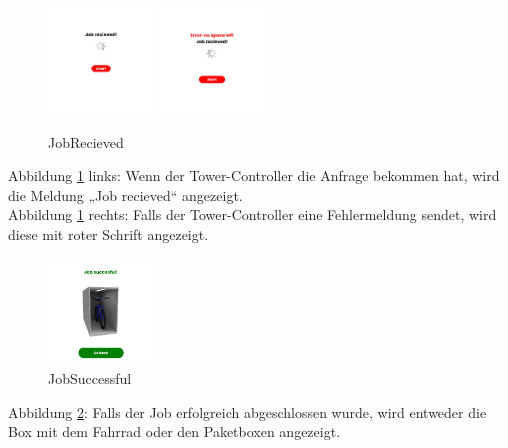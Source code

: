 \begin{figure}[H]
  \centering
  \includegraphics[width=0.25\textwidth]{images/app-screenshots/recieved.png}
  \includegraphics[width=0.25\textwidth]{images/app-screenshots/error.png}
  \caption{JobRecieved}
  \label{fig:screenrecieved}
\end{figure}
Abbildung \ref{fig:screenrecieved} links: Wenn der Tower-Controller die Anfrage bekommen hat, wird die Meldung „Job recieved“ angezeigt.\\
Abbildung \ref{fig:screenrecieved} rechts: Falls der Tower-Controller eine Fehlermeldung sendet, wird diese mit roter Schrift angezeigt.\\

\begin{figure}[H]
  \centering
  \includegraphics[width=0.25\textwidth]{images/app-screenshots/succes.png}
  \caption{JobSuccessful}
  \label{fig:success}
\end{figure}
Abbildung \ref{fig:success}: Falls der Job erfolgreich abgeschlossen wurde, wird entweder die Box mit dem Fahrrad oder den Paketboxen angezeigt.\\

